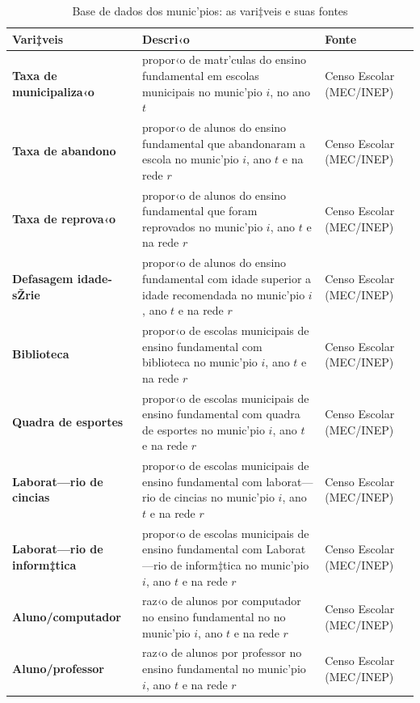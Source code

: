 \documentclass[a4paper, 12pt]{article}
\begin{document}
\vspace*{0.3cm} 
\begin{table}[htb]\centering
\begin{footnotesize}
\def\sym#1{\ifmmode^{#1}\else\(^{#1}\)\fi}
\caption{Base de dados dos munic’pios: as vari‡veis e suas fontes} 
\label{tab:varmuni}
\begin{tabular}{ p{3cm} | p{9cm} | p{2cm}}  
\toprule
\bf{Vari‡veis} & \bf{Descri‹o} & \bf{Fonte}  \\
\midrule
\hline
\bf{Taxa de municipaliza‹o} &  propor‹o de matr’culas do ensino fundamental em escolas municipais no munic’pio $i$, no ano $t$  & Censo Escolar (MEC/INEP)  \\
\hline
\bf{Taxa de abandono} &  propor‹o de alunos do ensino fundamental que abandonaram a escola no munic’pio $i$, ano $t$ e na rede $r$ & Censo Escolar (MEC/INEP) \\
\hline
\bf{Taxa de reprova‹o} & propor‹o de alunos do ensino fundamental que foram reprovados no munic’pio $i$, ano $t$ e na rede $r$ & Censo Escolar (MEC/INEP)  \\
\hline
\bf{Defasagem idade-sŽrie} & propor‹o de alunos do ensino fundamental com idade superior a idade recomendada no munic’pio $i$, ano $t$ e na rede $r$ & Censo Escolar (MEC/INEP)  \\
\hline
\bf{Biblioteca} & propor‹o de escolas municipais de ensino fundamental com biblioteca no munic’pio $i$, ano $t$ e na rede $r$ & Censo Escolar (MEC/INEP)  \\
\hline
\bf{Quadra de esportes} & propor‹o de escolas municipais de ensino fundamental com quadra de esportes no munic’pio $i$, ano $t$ e na rede $r$ & Censo Escolar (MEC/INEP)  \\
\hline
\bf{Laborat—rio de cincias} & propor‹o de escolas municipais de ensino fundamental com laborat—rio de cincias no munic’pio $i$, ano $t$ e na rede $r$ & Censo Escolar (MEC/INEP)  \\
\hline
\bf{Laborat—rio de inform‡tica} & propor‹o de escolas municipais de ensino fundamental com Laborat—rio de inform‡tica no munic’pio $i$, ano $t$ e na rede $r$ & Censo Escolar (MEC/INEP)  \\
\hline
\bf{Aluno/computador} & raz‹o de alunos por computador no ensino fundamental no no munic’pio $i$, ano $t$ e na rede $r$ & Censo Escolar (MEC/INEP)  \\
\hline
\bf{Aluno/professor} & raz‹o de alunos por professor no ensino fundamental no munic’pio $i$, ano $t$ e na rede $r$ & Censo Escolar (MEC/INEP)  \\

\end{tabular}
\end{footnotesize}
\end{table}
\end{document}
